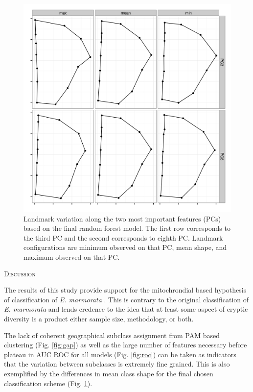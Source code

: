 \documentclass[12pt,letterpaper]{article}\usepackage{graphicx, color}
\renewcommand{\section}[1]{%
\bigskip
\begin{center}
\begin{Large}
\normalfont\scshape #1
\medskip
\end{Large}
\end{center}}
\begin{document}
\begin{figure}[ht]
  \centering
  \includegraphics[width = \textwidth]{figure/imp_var}
  \caption{Landmark variation along the two most important features (PCs) based on the final random forest model. The first row corresponds to the third PC and the second corresponds to eighth PC. Landmark configurations are minimum observed on that PC, mean shape, and maximum observed on that PC.}
  \label{fig:imp_var}
\end{figure}

\section{Discussion}
The results of this study provide support for the mitochrondial based hypothesis of classification of \textit{E. marmorata} \citep{Spinks2005,Spinks2010}. This is contrary to the original classification of \textit{E. marmorata} \citep{Seeliger1945} and lends credence to the idea that at least some aspect of cryptic diversity is a product either sample size, methodology, or both.

The lack of coherent geographical subclass assignment from PAM based clustering (Fig. \ref{fig:gap}) as well as the large number of features necessary before plateau in AUC ROC for all models (Fig. \ref{fig:roc}) can be taken as indicators that the variation between subclasses is extremely fine grained. This is also exemplified by the differences in mean class shape for the final chosen classification scheme (Fig. \ref{fig:imp_var}).
\end{document}
